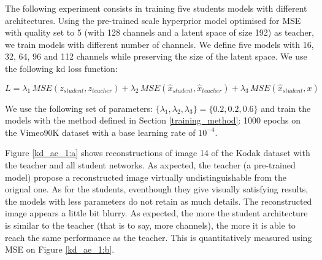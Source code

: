 The following experiment consists in training five students models with different architectures. Using the pre-trained scale hyperprior model optimised for MSE with \textsf{quality} set to 5 (with 128 channels and a latent space of size 192) as teacher, we train models with different number of channels. We define five models with 16, 32, 64, 96 and 112 channels while preserving the size of the latent space. We use the following \acrshort{kd} loss function:

\begin{equation}
    L = \lambda_{1}\, MSE(z_{student}, z_{teacher}) + \lambda_{2}\, MSE(\hat{x}_{student}, \hat{x}_{teacher}) + \lambda_{3}\, MSE(\hat{x}_{student}, x)
    \label{loss_1}
\end{equation}

We use the following set of parameters: \(\{\lambda_{1}, \lambda_{2}, \lambda_{3}\} = \{0.2, 0.2, 0.6\}\) and train the models with the method defined in Section \ref{training_method}: 1000 epochs on the Vimeo90K dataset with a base learning rate of \(10^{-4}\).

Figure \ref{kd_ae_1:a} shows reconstructions of image 14 of the Kodak dataset with the teacher and all student networks. As axpected, the teacher (a pre-trained model) propose a reconstructed image virtually undistinguishable from the orignal one. As for the students, eventhough they give visually satisfying results, the models with less parameters do not retain as much details. The reconstructed image appears a little bit blurry. As expected, the more the student architecture is similar to the teacher (that is to say, more channels), the more it is able to reach the same performance as the teacher. This is quantitatively measured using MSE on Figure \ref{kd_ae_1:b}.

